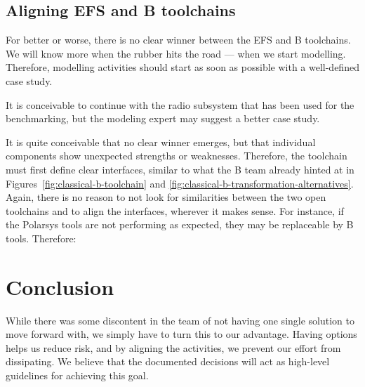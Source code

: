 
\subsection{Aligning EFS and B toolchains}

For better or worse, there is no clear winner between the EFS and B toolchains.  We will know more when the rubber hits the road --- when we start modelling.  Therefore, modelling activities should start as soon as possible with a well-defined case study.


It is conceivable to continue with the radio subsystem that has been used for the benchmarking, but the modeling expert may suggest a better case study.

It is quite conceivable that no clear winner emerges, but that individual components show unexpected strengths or weaknesses.  Therefore, the toolchain must first define clear interfaces, similar to what the B team already hinted at in Figures~\ref{fig:classical-b-toolchain} and \ref{fig:classical-b-transformation-alternatives}.  Again, there is no reason to not look for similarities between the two open toolchains and to align the interfaces, wherever it makes sense.  For instance, if the Polarsys tools are not performing as expected, they may be replaceable by B tools.  Therefore:


\section{Conclusion}

While there was some discontent in the team of not having one single solution to move forward with, we simply have to turn this to our advantage.  Having options helps us reduce risk, and by aligning the activities, we prevent our effort from dissipating.  We believe that the documented decisions will act as high-level guidelines for achieving this goal.


